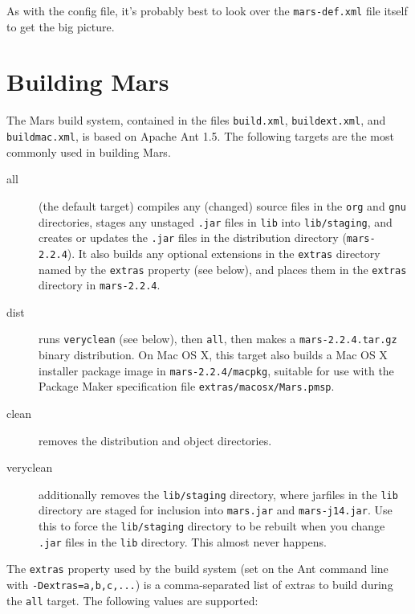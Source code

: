 \documentclass{article}
\newcommand{\filename}[1]{{\tt #1}}
\newcommand{\cmdline}[1]{{\tt #1}}
\newcommand{\identifier}[1]{{\tt #1}}
\begin{document}
As with the config file, it's probably best to look over the
\filename{mars-def.xml} file itself to get the big picture.

\section{Building Mars}
The Mars build system, contained in the files \filename{build.xml},
\filename{buildext.xml}, and \filename{buildmac.xml}, is based on
Apache Ant 1.5. The following targets are the most commonly used in
building Mars.

\begin{description} 
\item[all] (the default target) compiles any (changed) source files in
  the \filename{org} and \filename{gnu} directories, stages any
  unstaged \filename{.jar} files in \filename{lib} into
  \filename{lib/staging}, and creates or updates the \filename{.jar}
  files in the distribution directory (\filename{mars-2.2.4}). It also
  builds any optional extensions in the \filename{extras} directory
  named by the \identifier{extras} property (see below), and places
  them in the \filename{extras} directory in \filename{mars-2.2.4}.
\item[dist] runs \identifier{veryclean} (see below), then
  \identifier{all}, then makes a \filename{mars-2.2.4.tar.gz} binary
  distribution. On Mac OS X, this target also builds a Mac OS X
  installer package image in \filename{mars-2.2.4/macpkg}, suitable
  for use with the Package Maker specification file
  \filename{extras/macosx/Mars.pmsp}.
\item[clean] removes the distribution and object directories.
\item[veryclean] additionally removes the \filename{lib/staging}
  directory, where jarfiles in the \filename{lib} directory are staged
  for inclusion into \filename{mars.jar} and
  \filename{mars-j14.jar}. Use this to force the
  \filename{lib/staging} directory to be rebuilt when you change
  \filename{.jar} files in the \filename{lib} directory. This almost
  never happens.
\end{description}

The \identifier{extras} property used by the build system (set on the
Ant command line with \cmdline{-Dextras=a,b,c,...}) is a
comma-separated list of extras to build during the \identifier{all}
target. The following values are supported:
\end{document}

